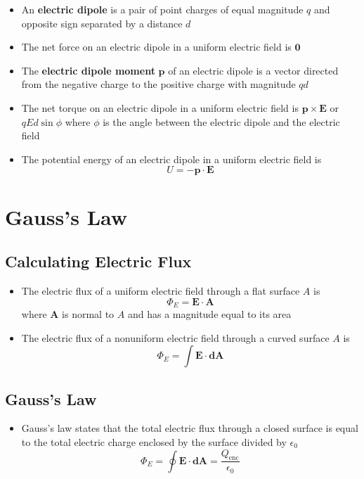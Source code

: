 \documentclass{article}
\begin{document}
\begin{itemize}
  \item An \textbf{electric dipole} is a pair of point charges of equal magnitude $q$ and opposite sign separated by a distance $d$

  \item The net force on an electric dipole in a uniform electric field is $\mathbf{0}$

  \item The \textbf{electric dipole moment} $\mathbf{p}$ of an electric dipole is a vector directed from the negative charge to the positive charge with magnitude $qd$

  \item The net torque on an electric dipole in a uniform electric field is $\mathbf{p} \times \mathbf{E}$ or $qEd\sin\phi$ where $\phi$ is the angle between the electric dipole and the electric field

  \item The potential energy of an electric dipole in a uniform electric field is \[U = -\mathbf{p} \cdot \mathbf{E}\]
\end{itemize}

\section{Gauss's Law}

\subsection{Calculating Electric Flux}

\begin{itemize}
  \item The electric flux of a uniform electric field through a flat surface $A$ is \[\Phi_E = \mathbf{E} \cdot \mathbf{A}\] where $\mathbf{A}$ is normal to $A$ and has a magnitude equal to its area

  \item The electric flux of a nonuniform electric field through a curved surface $A$ is \[\Phi_E = \int \mathbf{E} \cdot \mathbf{dA}\]
\end{itemize}

\subsection{Gauss's Law}

\begin{itemize}
  \item Gauss's law states that the total electric flux through a closed surface is equal to the total electric charge enclosed by the surface divided by $\epsilon_0$ \[\Phi_E = \oint \mathbf{E} \cdot \mathbf{dA} = \frac{Q_\textrm{enc}}{\epsilon_0}\]
\end{itemize}
\end{document}
